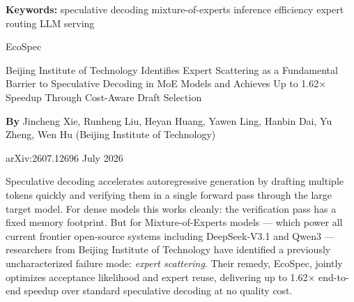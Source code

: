 \documentclass[10pt,twocolumn]{article}
\begin{document}
\setlength{\parindent}{0pt}
\setlength{\parskip}{4pt}

{\small\color{keywordgray}\textbf{Keywords:}
  speculative decoding \textbullet{}
  mixture-of-experts \textbullet{}
  inference efficiency \textbullet{}
  expert routing \textbullet{}
  LLM serving}\par\vspace{4pt}

{\LARGE\bfseries\raggedright
  EcoSpec}\par\vspace{4pt}

{\large\itshape\raggedright
  Beijing Institute of Technology Identifies Expert Scattering as a
  Fundamental Barrier to Speculative Decoding in MoE Models and Achieves
  Up to 1.62$\times$ Speedup Through Cost-Aware Draft Selection}\par\vspace{6pt}

{\small\textbf{By} Jincheng Xie, Runheng Liu, Heyan Huang, Yawen Ling,
  Hanbin Dai, Yu Zheng, Wen Hu
  (Beijing Institute of Technology)}\par\vspace{2pt}

{\small\color{keywordgray}arXiv:2607.12696 \textbullet{}
  July 2026}
\par\vspace{2pt}\noindent{\color{rulered}\rule{\columnwidth}{0.6pt}}\vspace{6pt}

Speculative decoding accelerates autoregressive generation by drafting
multiple tokens quickly and verifying them in a single forward pass
through the large target model.
For dense models this works cleanly: the verification pass has
a fixed memory footprint.
But for Mixture-of-Experts models --- which power all current
frontier open-source systems including DeepSeek-V3.1 and Qwen3 ---
researchers from Beijing Institute of Technology have identified
a previously uncharacterized failure mode: \emph{expert scattering}.
Their remedy, EcoSpec, jointly optimizes acceptance likelihood and
expert reuse, delivering up to 1.62$\times$ end-to-end speedup
over standard speculative decoding at no quality cost.
\end{document}
